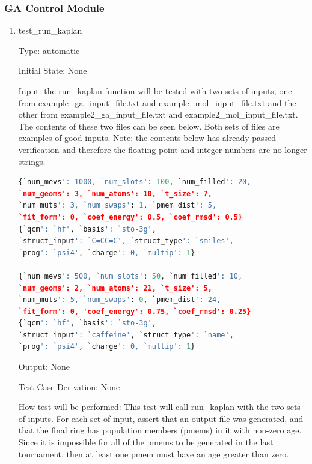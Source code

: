 \documentclass[12pt, titlepage]{article}
\begin{document}
\subsubsection{GA Control Module}


\begin{enumerate}
	
\item{test\_run\_kaplan\\}

Type: automatic

Initial State: None

Input: the run\_kaplan function will be tested with two sets of inputs, one 
from example\_ga\_input\_file.txt and example\_mol\_input\_file.txt and the 
other from example2\_ga\_input\_file.txt and example2\_mol\_input\_file.txt. 
The contents of these two files can be seen below. Both sets of files are 
examples of good inputs. Note: the contents below has already passed 
verification and therefore the floating point and integer numbers are no longer 
strings.

\begin{lstlisting}[language=python, showstringspaces=false]
{`num_mevs': 1000, `num_slots': 100, `num_filled': 20,
`num_geoms': 3, `num_atoms': 10, `t_size': 7,
`num_muts': 3, `num_swaps': 1, `pmem_dist': 5,
`fit_form': 0, `coef_energy': 0.5, `coef_rmsd': 0.5}
{`qcm': `hf', `basis': `sto-3g',
`struct_input': `C=CC=C', `struct_type': `smiles',
`prog': `psi4', `charge': 0, `multip': 1}

{`num_mevs': 500, `num_slots': 50, `num_filled': 10,
`num_geoms': 2, `num_atoms': 21, `t_size': 5,
`num_muts': 5, `num_swaps': 0, `pmem_dist': 24,
`fit_form': 0, 'coef_energy': 0.75, `coef_rmsd': 0.25}
{`qcm': `hf', `basis': `sto-3g',
`struct_input': `caffeine', `struct_type': `name',
`prog': `psi4', `charge': 0, `multip': 1}
\end{lstlisting}

Output: None

Test Case Derivation: None

How test will be performed: This test will call run\_kaplan with the two sets 
of inputs. For each set of input, assert that an output file was generated, and 
that the final ring has population members (pmems) in it with non-zero age. 
Since it is impossible for all of the pmems to be generated in the last 
tournament, then at least one pmem must have an age greater than zero.


\end{enumerate}
\end{document}
